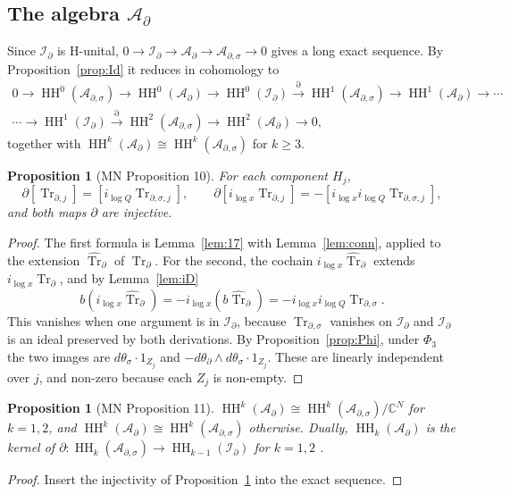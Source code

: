 \documentclass[11pt,oneside,reqno]{article}
\DeclareMathOperator{\HH}{HH}
\DeclareMathOperator{\Tr}{Tr}
\newcommand{\C}{\mathbb C}
\newcommand{\Id}{\mathcal I_\partial}
\newcommand{\Ad}{\mathcal A_\partial}
\newcommand{\Ads}{\mathcal A_{\partial,\sigma}}
\newcommand{\Trd}{\Tr_\partial}
\newcommand{\Trds}{\Tr_{\partial,\sigma}}
\newcommand{\hTrd}{\widehat{\Tr}_\partial}
\newcommand{\lQ}{\log Q}
\newcommand{\lx}{\log x}
\theoremstyle{plain}
\newtheorem{proposition}[theorem]{Proposition}
\theoremstyle{definition}
\theoremstyle{remark}
\begin{document}
\subsection{The algebra \texorpdfstring{\(\Ad\)}{Ad}}
Since \(\Id\) is H-unital, \(0\to\Id\to\Ad\to\Ads\to0\) gives a long
exact sequence. By Proposition~\ref{prop:Id} it reduces in cohomology to
\cite[(71)--(72)]{MN}
\begin{gather*}
 0\to\HH^0(\Ads)\to\HH^0(\Ad)\to\HH^0(\Id)\xrightarrow{\partial}
 \HH^1(\Ads)\to\HH^1(\Ad)\to\cdots\\
 \cdots\to\HH^1(\Id)\xrightarrow{\partial}\HH^2(\Ads)\to\HH^2(\Ad)\to0,
\end{gather*}
together with \(\HH^k(\Ad)\cong\HH^k(\Ads)\) for \(k\ge3\).

\begin{proposition}[MN Proposition 10]\label{prop:10}
For each component \(H_j\),
\[
 \partial[\Tr_{\partial,j}]=[i_{\lQ}\Tr_{\partial,\sigma,j}],\qquad
 \partial[i_{\lx}\Tr_{\partial,j}]=-[i_{\lx}i_{\lQ}\Tr_{\partial,\sigma,j}],
\]
and both maps \(\partial\) are injective.
\end{proposition}

\begin{proof}
The first formula is Lemma~\ref{lem:17} with Lemma~\ref{lem:conn},
applied to the extension \(\hTrd\) of \(\Trd\). For the second, the
cochain \(i_{\lx}\hTrd\) extends \(i_{\lx}\Trd\), and by
Lemma~\ref{lem:iD}
\[
 b(i_{\lx}\hTrd)=-i_{\lx}(b\hTrd)=-i_{\lx}i_{\lQ}\Trds .
\]
This vanishes when one argument is in \(\Id\), because \(\Trds\)
vanishes on \(\Id\) and \(\Id\) is an ideal preserved by both
derivations. By Proposition~\ref{prop:Phi}, under \(\Phi_3\) the two
images are \(d\theta_\sigma\cdot1_{Z_j}\) and \(-d\theta_\partial\wedge
d\theta_\sigma\cdot1_{Z_j}\). These are linearly independent over \(j\),
and non-zero because each \(Z_j\) is non-empty.
\end{proof}

\begin{proposition}[MN Proposition 11]\label{prop:Ad}
\(\HH^k(\Ad)\cong\HH^k(\Ads)/\C^N\) for \(k=1,2\), and
\(\HH^k(\Ad)\cong\HH^k(\Ads)\) otherwise. Dually, \(\HH_k(\Ad)\) is the
kernel of \(\partial:\HH_k(\Ads)\to\HH_{k-1}(\Id)\) for \(k=1,2\)
\cite[(75)]{MN}.
\end{proposition}

\begin{proof}
Insert the injectivity of Proposition~\ref{prop:10} into the exact
sequence.
\end{proof}
\end{document}
